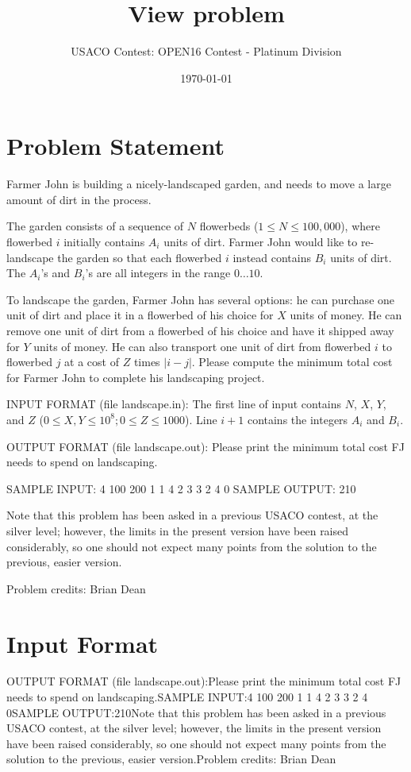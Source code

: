 \documentclass[12pt]{article}
\title{View problem}
\author{USACO Contest: OPEN16 Contest - Platinum Division}
\date{\today}
\begin{document}
\maketitle

\section*{Problem Statement}

Farmer John is building a nicely-landscaped garden, and needs to move a large
amount of dirt in the process.

The garden consists of a sequence of $N$ flowerbeds ($1 \leq N \leq 100,000$),
where flowerbed $i$ initially contains $A_i$ units of dirt.  Farmer John would
like to re-landscape the garden so that each flowerbed $i$ instead contains
$B_i$ units of dirt.  The $A_i$'s and $B_i$'s are all integers in the range
$0 \ldots 10$.

To landscape the garden, Farmer John has several options: he can purchase one
unit of dirt and place it in a flowerbed of his choice for $X$ units of money. 
He can remove one unit of dirt from a flowerbed of his choice and have it 
shipped away for $Y$ units of money.  He can also transport one unit of dirt
from  flowerbed $i$ to flowerbed $j$ at a cost of $Z$ times $|i-j|$.  Please
compute the minimum  total cost for Farmer John to complete his landscaping
project.

INPUT FORMAT (file landscape.in):
The first line of input contains $N$, $X$, $Y$, and $Z$
($0 \leq X, Y \le 10^8; 0 \le Z \leq 1000$).  Line $i+1$ contains the integers $A_i$ and $B_i$.

OUTPUT FORMAT (file landscape.out):
Please print the minimum total cost FJ needs to spend on landscaping.

SAMPLE INPUT:
4 100 200 1
1 4
2 3
3 2
4 0
SAMPLE OUTPUT: 
210

Note that this problem has been asked in a previous USACO contest,
at the silver level; however, the limits in the present version have
been raised considerably, so one should not expect many points from
the solution to the previous, easier version. 


Problem credits: Brian Dean



\section*{Input Format}
OUTPUT FORMAT (file landscape.out):Please print the minimum total cost FJ needs to spend on landscaping.SAMPLE INPUT:4 100 200 1
1 4
2 3
3 2
4 0SAMPLE OUTPUT:210Note that this problem has been asked in a previous USACO contest,
at the silver level; however, the limits in the present version have
been raised considerably, so one should not expect many points from
the solution to the previous, easier version.Problem credits: Brian Dean
\end{document}
